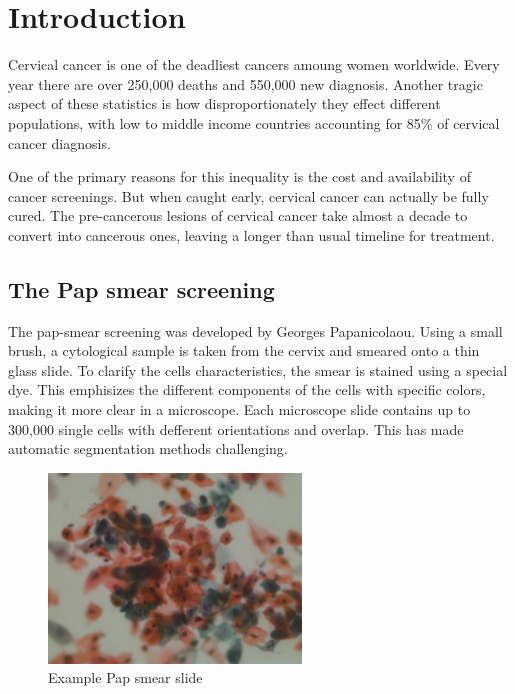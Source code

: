 \documentclass[ms,electronic,oneside,twosidetoc,letterpaper,chaptercenter,parttop]{byumsphd}
\title{\Title}
\author{\Author}
\begin{document}
\maketitle
{}

\chapter{Introduction}

Cervical cancer is one of the deadliest cancers amoung women worldwide. Every year there are over
250,000 deaths and 550,000 new diagnosis. Another tragic aspect of these statistics is how disproportionately
they effect different populations, with low to middle income countries accounting for 85\% of cervical cancer diagnosis.

One of the primary reasons for this inequality is the cost and availability of cancer screenings. But when caught early, cervical cancer can actually be fully cured. 
The pre-cancerous lesions of cervical cancer take almost a decade to convert into cancerous ones, leaving a longer than usual timeline for treatment. \cite{epid}

\section{The Pap smear screening}

The pap-smear screening was developed by Georges Papanicolaou. Using a small brush, a cytological sample is taken from the cervix and smeared onto a thin glass slide. 
To clarify the cells characteristics, the smear is stained using a special dye. This emphisizes the different components of the cells with specific colors, making it more clear in a microscope.\cite{herlev2}
Each microscope slide contains up to 300,000 single cells with defferent orientations and overlap\cite{herlev2}. This has made automatic segmentation methods challenging.

\begin{figure}[H]
  \centering
  \includegraphics[width=0.60\textwidth]{cells/dysketarotic_059}
  \caption{Example Pap smear slide}
\end{figure}
\end{document}
